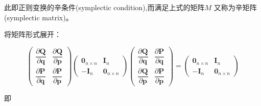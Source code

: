 \documentclass[12pt]{ctexart}
\begin{document}
此即正则变换的辛条件(symplectic condition),而满足上式的矩阵$M$ 又称为辛矩阵
(symplectic matrix)。

将矩阵形式展开：

\begin{equation}
\begin{pmatrix}\dfrac{\partial\boldsymbol{Q}}{\partial\boldsymbol{q}}&\dfrac{\partial\boldsymbol{Q}}{\partial\boldsymbol{p}}\\\dfrac{\partial\boldsymbol{P}}{\partial\boldsymbol{q}}&\dfrac{\partial\boldsymbol{P}}{\partial\boldsymbol{p}}\end{pmatrix}\begin{pmatrix}\boldsymbol{0}_{n\times n}&\boldsymbol{I}_n\\-\boldsymbol{I}_n&\boldsymbol{0}_{n\times n}\end{pmatrix}\begin{pmatrix}\dfrac{\partial\boldsymbol{Q}}{\partial\boldsymbol{q}}&\dfrac{\partial\boldsymbol{P}}{\partial\boldsymbol{q}}\\\dfrac{\partial\boldsymbol{Q}}{\partial\boldsymbol{p}}&\dfrac{\partial\boldsymbol{P}}{\partial\boldsymbol{p}}\end{pmatrix}=\begin{pmatrix}\boldsymbol{0}_{n\times n}&\boldsymbol{I}_n\\-\boldsymbol{I}_n&\boldsymbol{0}_{n\times n}\end{pmatrix}
\label{eq:23}
\end{equation}

即
\end{document}
